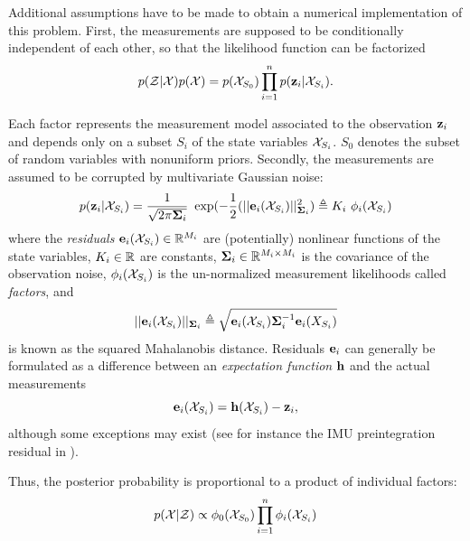 Additional assumptions have to be made to obtain a numerical implementation of this problem.
First, the measurements are supposed to be conditionally independent of each other, so that the likelihood function can be factorized 
%
\begin{equation}
    p(\mathcal{Z} | \mathcal{X}) p(\mathcal{X}) =  p(\mathcal{X}_{S_0}) \prod_{i=1}^{n} p({\bf z}_i | \mathcal{X}_{S_i}).
\end{equation}

Each factor represents the measurement model associated to the  observation ${\bf z}_i$ and depends only on a subset $S_i$ of the state variables $\mathcal{X}_{S_i}$. 
$S_0$ denotes the subset of random variables with nonuniform priors.
Secondly, the measurements are assumed to be corrupted by multivariate Gaussian noise:
%
\begin{equation}
    p({\bf z}_i | \mathcal{X}_{S_i}) = \frac{1}{\sqrt{2\pi{\bm \Sigma}_i}} ~ \exp(- \frac{1}{2} (||{\bf e}_i(\mathcal{X}_{S_i})||^2_{{\bm \Sigma}_i}) \triangleq K_i~\phi_i(\mathcal{X}_{S_i})
\end{equation}
%
where the \textit{residuals} ${\bf e}_i(\mathcal{X}_{S_i}) \in \mathbb{R}^{M_i}$ are (potentially) nonlinear functions of the state variables, $K_i \in \mathbb{R}$ are constants, 
${\bm \Sigma}_i \in \mathbb{R}^{M_i \times M_i}$ is the covariance of the observation noise,
$\phi_i(\mathcal{X}_{S_i})$ is the un-normalized measurement likelihoods called \textit{factors}, and 
%
\begin{equation*}
    ||{\bf e}_i(\mathcal{X}_{S_i})||_{{\bm \Sigma}_i} \triangleq \sqrt{{\bf e}_i(\mathcal{X}_{S_i}) {\bm \Sigma}_i^{-1} {\bf e}_i(X_{S_i})}
\end{equation*}
%
is known as the squared Mahalanobis distance. 
Residuals ${\bf e}_i$ can generally be formulated as a difference between an \textit{expectation function} ${\bf h}$ and the actual measurements
%
\begin{equation}
    {\bf e}_i(\mathcal{X}_{S_i}) = {\bf h}(\mathcal{X}_{S_i}) - {\bf z}_i,
    \label{eq:error_expectation}
\end{equation}
%
although some exceptions may exist (see for instance the IMU preintegration residual  in ).

Thus, the posterior probability is proportional to a product of individual factors:
%
\begin{equation}
    p(\mathcal{X} | \mathcal{Z}) \propto \phi_0(\mathcal{X}_{S_0}) \prod_{i=1}^{n} \phi_i(\mathcal{X}_{S_i}) 
    \label{eq:likelihood_factorization}
\end{equation}

